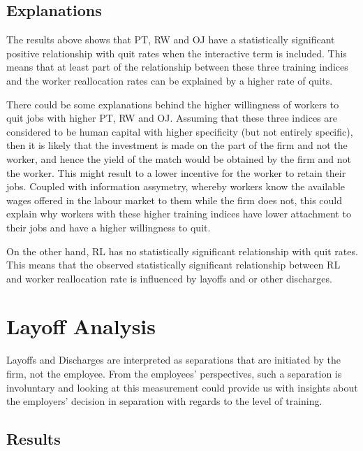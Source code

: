 \documentclass[
]{article}
\begin{document}
\hypertarget{explanations-1}{%
\subsection{Explanations}\label{explanations-1}}

The results above shows that PT, RW and OJ have a statistically
significant positive relationship with quit rates when the interactive
term is included. This means that at least part of the relationship
between these three training indices and the worker reallocation rates
can be explained by a higher rate of quits.

There could be some explanations behind the higher willingness of
workers to quit jobs with higher PT, RW and OJ. Assuming that these
three indices are considered to be human capital with higher specificity
(but not entirely specific), then it is likely that the investment is
made on the part of the firm and not the worker, and hence the yield of
the match would be obtained by the firm and not the worker. This might
result to a lower incentive for the worker to retain their jobs. Coupled
with information assymetry, whereby workers know the available wages
offered in the labour market to them while the firm does not, this could
explain why workers with these higher training indices have lower
attachment to their jobs and have a higher willingness to quit.

On the other hand, RL has no statistically significant relationship with
quit rates. This means that the observed statistically significant
relationship between RL and worker reallocation rate is influenced by
layoffs and or other discharges.

\hypertarget{layoff-analysis}{%
\section{Layoff Analysis}\label{layoff-analysis}}

Layoffs and Discharges are interpreted as separations that are initiated
by the firm, not the employee. From the employees' perspectives, such a
separation is involuntary and looking at this measurement could provide
us with insights about the employers' decision in separation with
regards to the level of training.

\hypertarget{results-3}{%
\subsection{Results}\label{results-3}}
\end{document}
